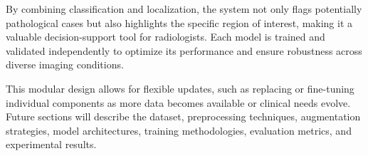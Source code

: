 By combining classification and localization, the system not only flags potentially pathological 
cases but also highlights the specific region of interest, making it a valuable decision-support 
tool for radiologists. Each model is trained and validated independently to optimize its performance 
and ensure robustness across diverse imaging conditions.

This modular design allows for flexible updates, such as replacing or fine-tuning individual 
components as more data becomes available or clinical needs evolve. Future sections will describe 
the dataset, preprocessing techniques, augmentation strategies, model architectures, training 
methodologies, evaluation metrics, and experimental results.
